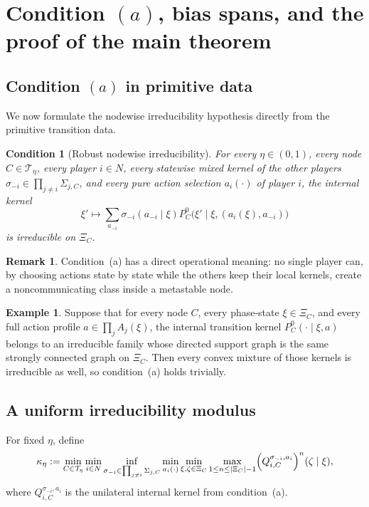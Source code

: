 \documentclass[12pt]{article}
\newtheorem{condition}[theorem]{Condition}
\theoremstyle{definition}
\newtheorem{remark}[theorem]{Remark}
\newtheorem{example}[theorem]{Example}
\newcommand{\1}{\mathbf{1}}
\newcommand{\cT}{\mathcal{T}}
\begin{document}
\section{Condition \texorpdfstring{$(a)$}{(a)}, bias spans, and the proof of the main theorem}
\label{sec:proof-main}

\subsection{Condition \texorpdfstring{$(a)$}{(a)} in primitive data}

We now formulate the nodewise irreducibility hypothesis directly from the primitive
transition data.

\begin{condition}[Robust nodewise irreducibility]
\label{cond:a}
For every $\eta\in(0,1)$, every node $C\in\cT_\eta$, every player $i\in N$, every
statewise mixed kernel of the other players $\sigma_{-i}\in\prod_{j\ne i}\Sigma_{j,C}$,
and every pure action selection $a_i(\cdot)$ of player $i$, the internal kernel
\[
\xi'\mapsto \sum_{a_{-i}}\sigma_{-i}(a_{-i}\mid\xi)
P_C^0\bigl(\xi'\mid\xi,(a_i(\xi),a_{-i})\bigr)
\]
is irreducible on $\Xi_C$.
\end{condition}

\begin{remark}
Condition~\textnormal{(a)} has a direct operational meaning: no single player can,
by choosing actions state by state while the others keep their local kernels,
create a noncommunicating class inside a metastable node.
\end{remark}

\begin{example}
\label{ex:cond-a-trivial}
Suppose that for every node $C$, every phase-state $\xi\in\Xi_C$, and every full
action profile $a\in\prod_j A_j(\xi)$, the internal transition kernel
$P_C^0(\cdot\mid\xi,a)$ belongs to an irreducible family whose directed support
graph is the same strongly connected graph on $\Xi_C$.  Then every convex mixture
of those kernels is irreducible as well, so condition~\textnormal{(a)} holds
trivially.
\end{example}

\subsection{A uniform irreducibility modulus}

For fixed $\eta$, define
\begin{equation}
\label{eq:kappa-eta}
\kappa_\eta
:=
\min_{C\in\cT_\eta}
\min_{i\in N}
\inf_{\sigma_{-i}\in\prod_{j\ne i}\Sigma_{j,C}}
\min_{a_i(\cdot)}
\min_{\xi,\zeta\in\Xi_C}
\max_{1\le n\le |\Xi_C|-1}
\Bigl(Q_{i,C}^{\sigma_{-i},a_i}\Bigr)^n(\zeta\mid\xi),
\end{equation}
where $Q_{i,C}^{\sigma_{-i},a_i}$ is the unilateral internal kernel from
condition~\textnormal{(a)}.
\end{document}
